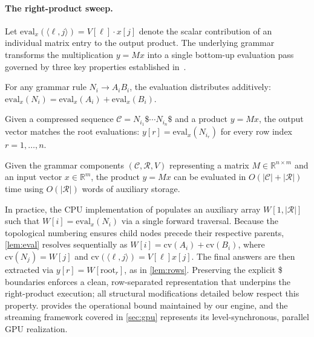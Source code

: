 \documentclass[twoside,leqno,twocolumn]{article}
\begin{document}
\paragraph{The right-product sweep.} Let $\mathrm{eval}_x(\langle\ell,j\rangle)=V[\ell]\cdot x[j]$ denote the scalar contribution of an individual matrix entry to the output product. The underlying grammar transforms the multiplication $y=Mx$ into a single bottom-up evaluation pass governed by three key properties established in~\cite{mmrepair}.

\begin{lemma}
\label{lem:eval}
For any grammar rule $N_i\to A_iB_i$, the evaluation distributes additively: $\mathrm{eval}_x(N_i)=\mathrm{eval}_x(A_i)+\mathrm{eval}_x(B_i)$.
\end{lemma}

\begin{lemma}
\label{lem:rows}
Given a compressed sequence $\mathcal{C}=N_{i_1}\$\cdots N_{i_n}\$$ and a product $y=Mx$, the output vector matches the root evaluations: $y[r]=\mathrm{eval}_x(N_{i_r})$ for every row index $r=1,\dots,n$.
\end{lemma}

\begin{theorem}
\label{thm:right}
Given the grammar components $(\mathcal{C},\mathcal{R},V)$ representing a matrix $M\in\mathbb{R}^{n\times m}$ and an input vector $x\in\mathbb{R}^m$, the product $y=Mx$ can be evaluated in $O(|\mathcal{C}|+|\mathcal{R}|)$ time using $O(|\mathcal{R}|)$ words of auxiliary storage.
\end{theorem}

In practice, the CPU implementation of \cite{mmrepair} populates an auxiliary array $W[1,|\mathcal{R}|]$ such that $W[i]=\mathrm{eval}_x(N_i)$ via a single forward traversal. Because the topological numbering ensures child nodes precede their respective parents, \cref{lem:eval} resolves sequentially as $W[i]=\mathrm{cv}(A_i)+\mathrm{cv}(B_i)$, where $\mathrm{cv}(N_j)=W[j]$ and $\mathrm{cv}(\langle\ell,j\rangle)=V[\ell]x[j]$. The final answers are then extracted via $y[r]=W[\mathrm{root}_r]$, as in \cref{lem:rows}. Preserving the explicit \$ boundaries enforces a clean, row-separated representation that underpins the right-product execution; all structural modifications detailed below respect this property.  provides the operational bound maintained by our engine, and the streaming framework covered in \cref{sec:gpu} represents its level-synchronous, parallel GPU realization.
\end{document}
